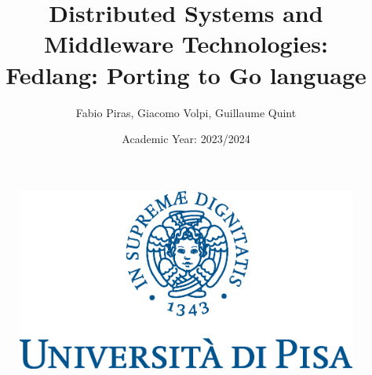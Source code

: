\documentclass[a4paper, openright]{report}
\author{Fabio Piras, Giacomo Volpi, Guillaume Quint}
\title{Distributed Systems and Middleware Technologies:\\
Fedlang: Porting to Go language}
\date{Academic Year: 2023/2024}
\begin{document}
\begin{figure}
\centering

\includegraphics[scale=0.75]{./images/cherubino}

\end{figure}
\maketitle
\thispagestyle{empty}
\newpage

\tableofcontents


\thispagestyle{empty}



\end{document}
